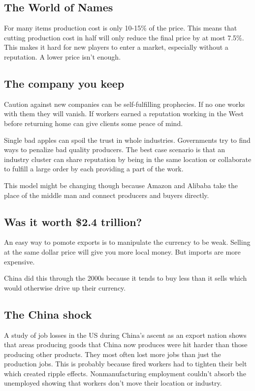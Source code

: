 \documentclass[a4paper, twocolumn]{article}
\begin{document}
\subsection{The World of Names}
For many items production cost is only 10-15\% of the price. This means that cutting production cost in half will only reduce the final price by at most 7.5\%. This makes it hard for new players to enter a market, especially without a reputation. A lower price isn't enough.

\subsection{The company you keep}
Caution against new companies can be self-fulfilling prophecies. If no one works with them they will vanish. If workers earned a reputation working in the West before returning home can give clients some peace of mind.

Single bad apples can spoil the trust in whole industries. Governments try to find ways to penalize bad quality producers. The best case scenario is that an industry cluster can share reputation by being in the same location or collaborate to fulfill a large order by each providing a part of the work.

This model might be changing though because Amazon and Alibaba take the place of the middle man and connect producers and buyers directly.

\subsection{Was it worth \$2.4 trillion?}
An easy way to pomote exports is to manipulate the currency to be weak. Selling at the same dollar price will give you more local money. But imports are more expensive.

China did this through the 2000s because it tends to buy less than it sells which would otherwise drive up their currency.

\subsection{The China shock}
A study \cite{china-syndrome} of job losses in the US during China's ascent as an export nation shows that areas producing goods that China now produces were hit harder than those producing other products. They most often lost more jobs than just the production jobs. This is probably because fired workers had to tighten their belt which created ripple effects. Nonmanufacturing employment couldn't absorb the unemployed showing that workers don't move their location or industry.
\end{document}
